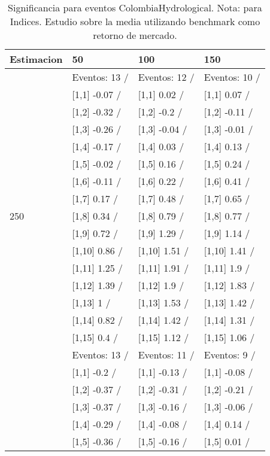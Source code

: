 \begin{table}

\caption{Significancia para eventos ColombiaHydrological. Nota: para Indices. Estudio sobre la media utilizando benchmark como retorno de mercado.}
\centering
\begin{tabular}[t]{llll}
\toprule
Estimacion & 50 & 100 & 150\\
\midrule
 & Eventos:  13 / & Eventos:  12 / & Eventos:  10 /\\
 & {}[1,1] -0.07  / & {}[1,1] 0.02  / & {}[1,1] 0.07  /\\
 & {}[1,2] -0.32  / & {}[1,2] -0.2  / & {}[1,2] -0.11  /\\
 & {}[1,3] -0.26  / & {}[1,3] -0.04  / & {}[1,3] -0.01  /\\
 & {}[1,4] -0.17  / & {}[1,4] 0.03  / & {}[1,4] 0.13  /\\
\addlinespace
 & {}[1,5] -0.02  / & {}[1,5] 0.16  / & {}[1,5] 0.24  /\\
 & {}[1,6] -0.11  / & {}[1,6] 0.22  / & {}[1,6] 0.41  /\\
 & {}[1,7] 0.17  / & {}[1,7] 0.48  / & {}[1,7] 0.65  /\\
250 & {}[1,8] 0.34  / & {}[1,8] 0.79  / & {}[1,8] 0.77  /\\
 & {}[1,9] 0.72  / & {}[1,9] 1.29  / & {}[1,9] 1.14  /\\
\addlinespace
 & {}[1,10] 0.86  / & {}[1,10] 1.51  / & {}[1,10] 1.41  /\\
 & {}[1,11] 1.25  / & {}[1,11] 1.91  / & {}[1,11] 1.9  /\\
 & {}[1,12] 1.39  / & {}[1,12] 1.9  / & {}[1,12] 1.83  /\\
 & {}[1,13] 1  / & {}[1,13] 1.53  / & {}[1,13] 1.42  /\\
 & {}[1,14] 0.82  / & {}[1,14] 1.42  / & {}[1,14] 1.31  /\\
\addlinespace
 & {}[1,15] 0.4  / & {}[1,15] 1.12  / & {}[1,15] 1.06  /\\
 & Eventos:  13 / & Eventos:  11 / & Eventos:  9 /\\
 & {}[1,1] -0.2  / & {}[1,1] -0.13  / & {}[1,1] -0.08  /\\
 & {}[1,2] -0.37  / & {}[1,2] -0.31  / & {}[1,2] -0.21  /\\
 & {}[1,3] -0.37  / & {}[1,3] -0.16  / & {}[1,3] -0.06  /\\
\addlinespace
 & {}[1,4] -0.29  / & {}[1,4] -0.08  / & {}[1,4] 0.14  /\\
 & {}[1,5] -0.36  / & {}[1,5] -0.16  / & {}[1,5] 0.01  /\\

\end{tabular}
\end{table}
